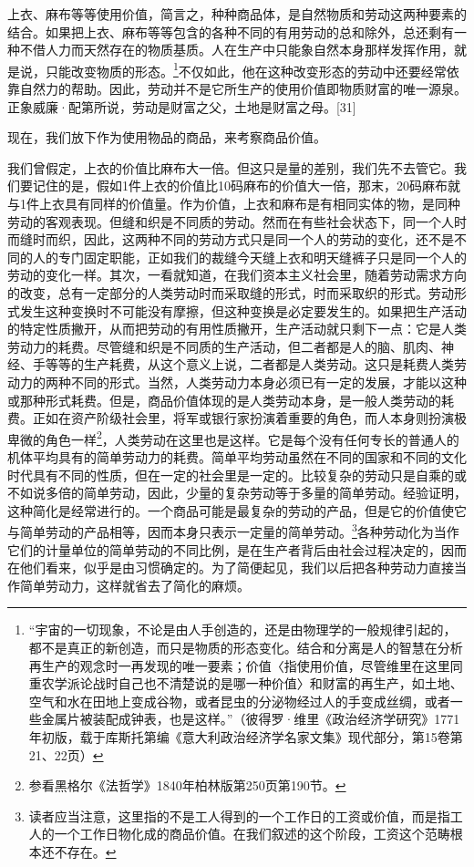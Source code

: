 \documentclass{ctexbook}
\begin{document}
    上衣、麻布等等使用价值，简言之，种种商品体，是自然物质和劳动这两种要素的结合。如果把上衣、麻布等等包含的各种不同的有用劳动的总和除外，总还剩有一种不借人力而天然存在的物质基质。人在生产中只能象自然本身那样发挥作用，就是说，只能改变物质的形态。\footnote{“宇宙的一切现象，不论是由人手创造的，还是由物理学的一般规律引起的，都不是真正的新创造，而只是物质的形态变化。结合和分离是人的智慧在分析再生产的观念时一再发现的唯一要素；价值〈指使用价值，尽管维里在这里同重农学派论战时自己也不清楚说的是哪一种价值〉和财富的再生产，如土地、空气和水在田地上变成谷物，或者昆虫的分泌物经过人的手变成丝绸，或者一些金属片被装配成钟表，也是这样。”（彼得罗·维里《政治经济学研究》1771年初版，载于库斯托第编《意大利政治经济学名家文集》现代部分，第15卷第21、22页）}不仅如此，他在这种改变形态的劳动中还要经常依靠自然力的帮助。因此，劳动并不是它所生产的使用价值即物质财富的唯一源泉。正象威廉·配第所说，劳动是财富之父，土地是财富之母。[31]

    现在，我们放下作为使用物品的商品，来考察商品价值。

    我们曾假定，上衣的价值比麻布大一倍。但这只是量的差别，我们先不去管它。我们要记住的是，假如1件上衣的价值比10码麻布的价值大一倍，那末，20码麻布就与1件上衣具有同样的价值量。作为价值，上衣和麻布是有相同实体的物，是同种劳动的客观表现。但缝和织是不同质的劳动。然而在有些社会状态下，同一个人时而缝时而织，因此，这两种不同的劳动方式只是同一个人的劳动的变化，还不是不同的人的专门固定职能，正如我们的裁缝今天缝上衣和明天缝裤子只是同一个人的劳动的变化一样。其次，一看就知道，在我们资本主义社会里，随着劳动需求方向的改变，总有一定部分的人类劳动时而采取缝的形式，时而采取织的形式。劳动形式发生这种变换时不可能没有摩擦，但这种变换是必定要发生的。如果把生产活动的特定性质撇开，从而把劳动的有用性质撇开，生产活动就只剩下一点：它是人类劳动力的耗费。尽管缝和织是不同质的生产活动，但二者都是人的脑、肌肉、神经、手等等的生产耗费，从这个意义上说，二者都是人类劳动。这只是耗费人类劳动力的两种不同的形式。当然，人类劳动力本身必须已有一定的发展，才能以这种或那种形式耗费。但是，商品价值体现的是人类劳动本身，是一般人类劳动的耗费。正如在资产阶级社会里，将军或银行家扮演着重要的角色，而人本身则扮演极卑微的角色一样\footnote{参看黑格尔《法哲学》1840年柏林版第250页第190节。}，人类劳动在这里也是这样。它是每个没有任何专长的普通人的机体平均具有的简单劳动力的耗费。简单平均劳动虽然在不同的国家和不同的文化时代具有不同的性质，但在一定的社会里是一定的。比较复杂的劳动只是自乘的或不如说多倍的简单劳动，因此，少量的复杂劳动等于多量的简单劳动。经验证明，这种简化是经常进行的。一个商品可能是最复杂的劳动的产品，但是它的价值使它与简单劳动的产品相等，因而本身只表示一定量的简单劳动。\footnote{读者应当注意，这里指的不是工人得到的一个工作日的工资或价值，而是指工人的一个工作日物化成的商品价值。在我们叙述的这个阶段，工资这个范畴根本还不存在。}各种劳动化为当作它们的计量单位的简单劳动的不同比例，是在生产者背后由社会过程决定的，因而在他们看来，似乎是由习惯确定的。为了简便起见，我们以后把各种劳动力直接当作简单劳动力，这样就省去了简化的麻烦。
\end{document}

